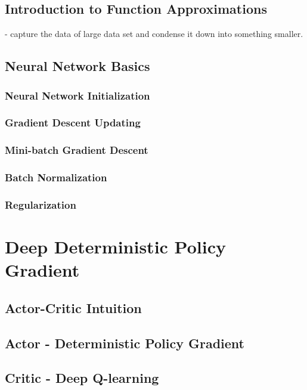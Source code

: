 \subsection{Introduction to Function Approximations}
- capture the data of large data set and condense it down into something smaller.
\subsection{Neural Network Basics}
\subsubsection{Neural Network Initialization}
\subsubsection{Gradient Descent Updating}
\subsubsection{Mini-batch Gradient Descent}
\subsubsection{Batch Normalization}
\subsubsection{Regularization}




\section{Deep Deterministic Policy Gradient}
\subsection{Actor-Critic Intuition}
\subsection{Actor - Deterministic Policy Gradient}
\subsection{Critic - Deep Q-learning}

